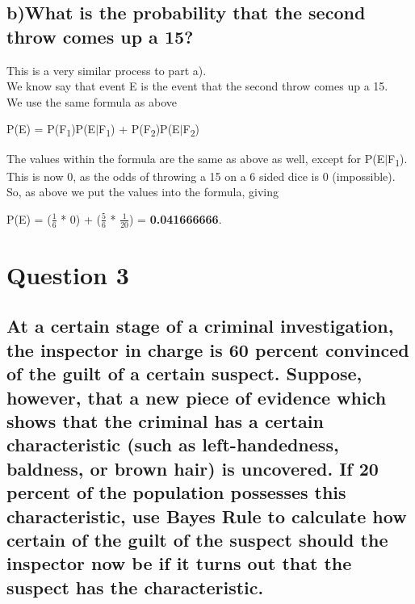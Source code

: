 \documentclass{report}
\begin{document}
		
		
		
		
		\subsection*{b)What is the probability that the second throw comes up a 15?}
		This is a very similar process to part a).\\
		We know say that event E is the event that the second throw comes up a 15.\\
		We use the same formula as above
		\begin{center}
			P(E) = P(F\textsubscript{1})P(E$\vert$F\textsubscript{1}) + P(F\textsubscript{2})P(E$\vert$F\textsubscript{2})
		\end{center}
		The values within the formula are the same as above as well, except for P(E$\vert$F\textsubscript{1}).\\
		This is now 0, as the odds of throwing a 15 on a 6 sided dice is 0 (impossible).\\
		So, as above we put the values into the formula, giving
		\begin{center}
			P(E) = ($\frac{1}{6}$ * 0) + ($\frac{5}{6}$ * $\frac{1}{20}$) = \textbf{0.041666666}.
		\end{center}
		
		
		
		\section*{\hfil Question 3 \hfil}
		\subsection*{At a certain stage of a criminal investigation, the inspector in charge is 60 percent convinced of the guilt of a certain suspect. Suppose, however, that a new piece of evidence which shows that the criminal has a certain characteristic (such as left-handedness, baldness, or brown hair) is uncovered. If 20 percent of the population possesses this characteristic, use Bayes Rule to calculate how certain of the guilt of the suspect should the inspector now be if it turns out that the suspect has the characteristic.}
		
\end{document}
